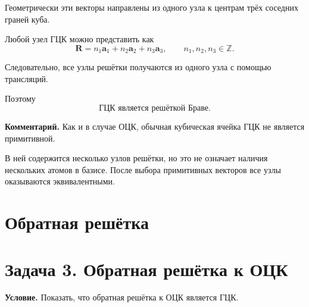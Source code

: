 \documentclass[../final.tex]{subfiles}
\begin{document}
Геометрически эти векторы направлены из одного узла
к центрам трёх соседних граней куба.

Любой узел ГЦК можно представить как
%
\begin{equation*}
    \boxed{
        \mathbf R
        =
        n_1\mathbf a_1
        +
        n_2\mathbf a_2
        +
        n_3\mathbf a_3
    },
    \qquad
    n_1,n_2,n_3\in\mathbb Z.
\end{equation*}

Следовательно, все узлы решётки получаются из одного узла
с помощью трансляций.

Поэтому
%
\begin{equation*}
    \boxed{
        \text{ГЦК является решёткой Браве.}
    }
\end{equation*}

\textbf{Комментарий.}
Как и в случае ОЦК, обычная кубическая ячейка ГЦК
не является примитивной.

В ней содержится несколько узлов решётки, но это не означает
наличия нескольких атомов в базисе. После выбора примитивных
векторов все узлы оказываются эквивалентными.



\section*{Обратная решётка}



\section{Задача 3. Обратная решётка к ОЦК}

\textbf{Условие.}
Показать, что обратная решётка к ОЦК является ГЦК.
\end{document}
